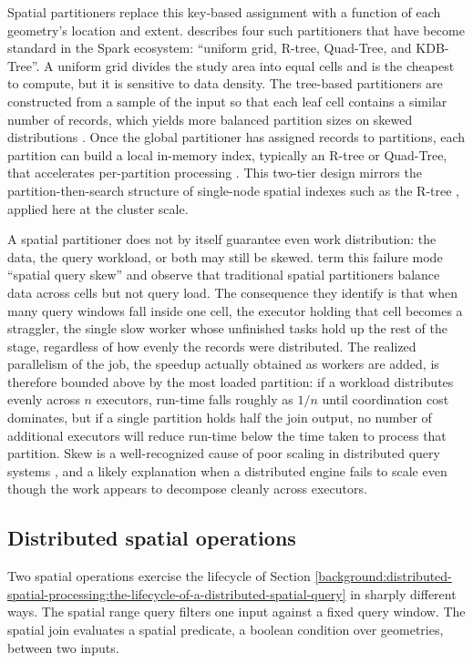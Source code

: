 Spatial partitioners replace this key-based assignment with a function of each geometry's location and extent. \textcite{yu2019_geospark_perspective_beyond} describes four such partitioners that have become standard in the Spark ecosystem: \enquote{uniform grid, R-tree, Quad-Tree, and KDB-Tree}. A uniform grid divides the study area into equal cells and is the cheapest to compute, but it is sensitive to data density. The tree-based partitioners are constructed from a sample of the input so that each leaf cell contains a similar number of records, which yields more balanced partition sizes on skewed distributions \parencite{yu2019_geospark_perspective_beyond}. Once the global partitioner has assigned records to partitions, each partition can build a local in-memory index, typically an R-tree or Quad-Tree, that accelerates per-partition processing \parencite{yu2019_geospark_perspective_beyond}. This two-tier design mirrors the partition-then-search structure of single-node spatial indexes such as the R-tree \parencite{guttman1984_rtree_dynamic_index}, applied here at the cluster scale.

A spatial partitioner does not by itself guarantee even work distribution: the data, the query workload, or both may still be skewed. \textcite{tang2020_locationspark_distributed_spatial_query} term this failure mode \enquote{spatial query skew} and observe that traditional spatial partitioners balance data across cells but not query load. The consequence they identify is that when many query windows fall inside one cell, the executor holding that cell becomes a straggler, the single slow worker whose unfinished tasks hold up the rest of the stage, regardless of how evenly the records were distributed. The realized parallelism of the job, the speedup actually obtained as workers are added, is therefore bounded above by the most loaded partition: if a workload distributes evenly across $n$ executors, run-time falls roughly as $1/n$ until coordination cost dominates, but if a single partition holds half the join output, no number of additional executors will reduce run-time below the time taken to process that partition. Skew is a well-recognized cause of poor scaling in distributed query systems \parencite{kwon2012_skewtune_mitigating_skew}, and a likely explanation when a distributed engine fails to scale even though the work appears to decompose cleanly across executors.

\subsection{Distributed spatial operations}
\label{background:distributed-spatial-processing:distributed-spatial-operations}
Two spatial operations exercise the lifecycle of Section \ref{background:distributed-spatial-processing:the-lifecycle-of-a-distributed-spatial-query} in sharply different ways. The spatial range query filters one input against a fixed query window. The spatial join evaluates a spatial predicate, a boolean condition over geometries, between two inputs.

